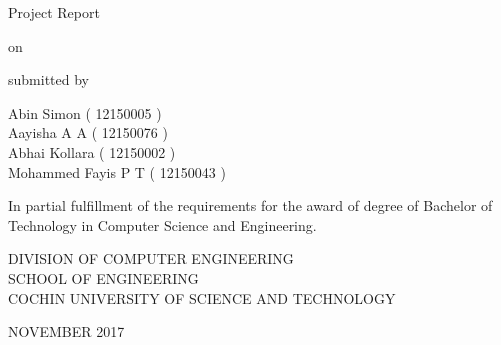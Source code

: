 \vspace*{\fill}

\begin{center}

\fontsize{14pt}{12pt}\selectfont
Project Report

\hspace{0.7em}

on

\hspace{0.7em}
\vspace{0.3in}

\fontsize{20pt}{12pt}

\hspace{1em}
\vspace{0.3in}

submitted by

\hspace{1em}
\vspace{0.3in}

\fontsize{14pt}{12pt}\selectfont
Abin Simon ( 12150005 )\\
Aayisha A A ( 12150076 )\\
Abhai Kollara ( 12150002 )\\
Mohammed Fayis P T ( 12150043 )

\hspace{1em}
\vspace{0.5in}

\normalsize
In partial fulfillment of the requirements for the award of degree of Bachelor of Technology in Computer Science and Engineering.

\hspace{1em}
\vspace{0.5in}

\fontsize{15pt}{12pt}\selectfont
DIVISION OF COMPUTER ENGINEERING\\
SCHOOL OF ENGINEERING\\
COCHIN UNIVERSITY OF SCIENCE AND TECHNOLOGY

\hspace{1em}

\normalsize
NOVEMBER 2017
\end{center}

\vspace*{\fill}
